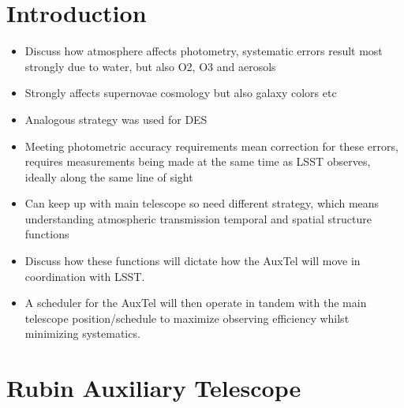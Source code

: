\section{Introduction}

\begin{itemize}
	\item Discuss how atmosphere affects photometry, systematic errors result most strongly due to water, but also O2, O3 and aerosols
	
	\item Strongly affects supernovae cosmology but also galaxy colors etc \citep{Li2016}
	
	\item Analogous strategy was used for DES \citep{Li2014}
	
	\item Meeting photometric accuracy requirements mean correction for these errors, requires measurements being made at the same time as LSST observes, ideally along the same line of sight
	
	\item Can keep up with main telescope so need different strategy, which means understanding atmospheric transmission temporal and spatial structure functions
	
	\item Discuss how these functions will dictate how the AuxTel will move in coordination with LSST.
	
	\item A scheduler for the AuxTel will then operate in tandem with the main telescope position/schedule \citep{PSTN-007} to maximize observing efficiency whilst minimizing systematics.
\end{itemize}



\section{Rubin Auxiliary Telescope}
 
